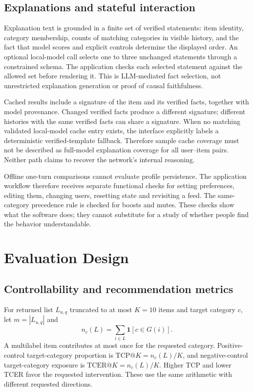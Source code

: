 \documentclass[conference]{IEEEtran}
\begin{document}
\subsection{Explanations and stateful interaction}
Explanation text is grounded in a finite set of verified statements: item identity, category membership, counts of matching categories in visible history, and the fact that model scores and explicit controls determine the displayed order. An optional local-model call selects one to three unchanged statements through a constrained schema. The application checks each selected statement against the allowed set before rendering it. This is LLM-mediated fact selection, not unrestricted explanation generation or proof of causal faithfulness.

Cached results include a signature of the item and its verified facts, together with model provenance. Changed verified facts produce a different signature; different histories with the same verified facts can share a signature. When no matching validated local-model cache entry exists, the interface explicitly labels a deterministic verified-template fallback. Therefore sample cache coverage must not be described as full-model explanation coverage for all user--item pairs. Neither path claims to recover the network's internal reasoning.

Offline one-turn comparisons cannot evaluate profile persistence. The application workflow therefore receives separate functional checks for setting preferences, editing them, changing users, resetting state and revisiting a feed. The same-category precedence rule is checked for boosts and mutes. These checks show what the software does; they cannot substitute for a study of whether people find the behavior understandable.

\section{Evaluation Design}
\subsection{Controllability and recommendation metrics}
For returned list $L_{u,q}$ truncated to at most $K=10$ items and target category $c$, let $m=|L_{u,q}|$ and
\begin{equation}
 n_c(L)=\sum_{i\in L}\mathbf 1[c\in G(i)].
\end{equation}
A multilabel item contributes at most once for the requested category. Positive-control target-category proportion is $\mathrm{TCP}@K=n_c(L)/K$, and negative-control target-category exposure is $\mathrm{TCER}@K=n_c(L)/K$. Higher TCP and lower TCER favor the requested intervention. These use the same arithmetic with different requested directions.
\end{document}
